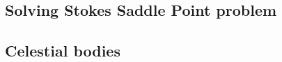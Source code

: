 \subsection{Solving Stokes Saddle Point problem}

{\scriptsize
\noindent
\cite{laqu86}
\cite{rotf90}
\cite{frha93}
\cite{elgo94}
\cite{cheb96}\cite{elma96}
\cite{brpv97}
\cite{lixu01}
\cite{dogs06}\cite{lica06}
\cite{hoow17}
}

\subsection{Celestial bodies}

